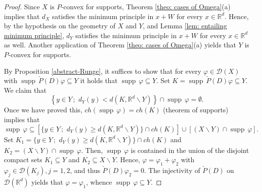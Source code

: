 \documentclass[12pt]{amsart}
\newcommand{\R}{\mathbb{R}}
\newcommand{\supp}{\operatorname{supp}\,}
\theoremstyle{definition}
\theoremstyle{remark}
\numberwithin{equation}{section}
\begin{document}
\begin{proof}
	Since $X$ is $P$-convex for supports, Theorem \ref{theo: cases of Omega}(a) implies that $d_X$ satisfies the minimum principle in $x+W$ for every $x\in\R^d$. Hence, by the hypothesis  on the geometry of $X$ and $Y$, and Lemma \ref{lem: entailing minimum principle}, $d_Y$ satisfies the minimum principle in $x+W$ for every $x\in\R^d$ as well. Another application of Theorem \ref{theo: cases of Omega}(a) yields that  $Y$ is $P$-convex for supports.

By Proposition \ref{abstract-Runge}, it suffices to show that for every $\varphi\in\mathscr{D}(X)$ with $\supp\check{P}(D)\varphi\subseteq Y$ it holds that $\supp\varphi\subseteq Y$. 
Set $K=\supp\check{P}(D)\varphi\subseteq Y$. We claim that 
	$$\left\{y\in Y\, ; \, \,d_Y(y)<d(K,\R^d\backslash Y)\right\} \cap \supp \varphi = \emptyset.$$
Once we have proved this, $ch(\supp\varphi)=ch(K)$ (theorem of supports) implies that
	$$\supp\varphi\subseteq\left[\{y\in Y\, ; \, \,d_Y(y)\geq d(K,\R^d\backslash Y)\}\cap ch(K)\right]\cup\left[(X\backslash Y)\cap\supp\varphi\right].$$
Set $K_1=\{y\in Y\, ; \, \,d_Y(y)\geq d(K,\R^d\backslash Y)\}\cap ch(K)$ and $K_2=(X\backslash Y)\cap\supp\varphi$. Then,  $\supp \varphi$ is contained in the union of the disjoint compact sets $K_1\subseteq Y$ and $K_2\subseteq X\backslash Y$. Hence, $\varphi=\varphi_1+\varphi_2$ with $\varphi_j\in\mathscr{D}(K_j), j=1,2$, and thus $\check{P}(D)\varphi_2= 0$. The injectivity of $\check{P}(D)$ on $\mathscr{D}(\R^d)$ yields that $\varphi=\varphi_1$, whence  $\supp\varphi\subseteq Y$.
	

\end{proof}
\end{document}
